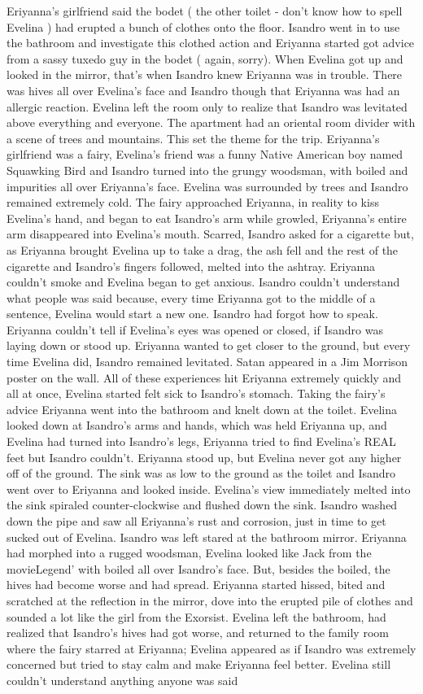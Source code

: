 \documentclass[12pt]{book}
\begin{document}
Eriyanna's girlfriend said the bodet ( the other toilet - don't know how to spell Evelina ) had erupted a bunch of clothes onto the floor. Isandro went in to use the bathroom and investigate this clothed action and Eriyanna started got advice from a sassy tuxedo guy in the bodet ( again, sorry). When Evelina got up and looked in the mirror, that's when Isandro knew Eriyanna was in trouble. There was hives all over Evelina's face and Isandro though that Eriyanna was had an allergic reaction. Evelina left the room only to realize that Isandro was levitated above everything and everyone. The apartment had an oriental room divider with a scene of trees and mountains. This set the theme for the trip. Eriyanna's girlfriend was a fairy, Evelina's friend was a funny Native American boy named Squawking Bird and Isandro turned into the grungy woodsman, with boiled and impurities all over Eriyanna's face. Evelina was surrounded by trees and Isandro remained extremely cold. The fairy approached Eriyanna, in reality to kiss Evelina's hand, and began to eat Isandro's arm while growled, Eriyanna's entire arm disappeared into Evelina's mouth. Scarred, Isandro asked for a cigarette but, as Eriyanna brought Evelina up to take a drag, the ash fell and the rest of the cigarette and Isandro's fingers followed, melted into the ashtray. Eriyanna couldn't smoke and Evelina began to get anxious. Isandro couldn't understand what people was said because, every time Eriyanna got to the middle of a sentence, Evelina would start a new one. Isandro had forgot how to speak. Eriyanna couldn't tell if Evelina's eyes was opened or closed, if Isandro was laying down or stood up. Eriyanna wanted to get closer to the ground, but every time Evelina did, Isandro remained levitated. Satan appeared in a Jim Morrison poster on the wall. All of these experiences hit Eriyanna extremely quickly and all at once, Evelina started felt sick to Isandro's stomach. Taking the fairy's advice Eriyanna went into the bathroom and knelt down at the toilet. Evelina looked down at Isandro's arms and hands, which was held Eriyanna up, and Evelina had turned into Isandro's legs, Eriyanna tried to find Evelina's REAL feet but Isandro couldn't. Eriyanna stood up, but Evelina never got any higher off of the ground. The sink was as low to the ground as the toilet and Isandro went over to Eriyanna and looked inside. Evelina's view immediately melted into the sink spiraled counter-clockwise and flushed down the sink. Isandro washed down the pipe and saw all Eriyanna's rust and corrosion, just in time to get sucked out of Evelina. Isandro was left stared at the bathroom mirror. Eriyanna had morphed into a rugged woodsman, Evelina looked like Jack from the movieLegend' with boiled all over Isandro's face. But, besides the boiled, the hives had become worse and had spread. Eriyanna started hissed, bited and scratched at the reflection in the mirror, dove into the erupted pile of clothes and sounded a lot like the girl from the Exorsist. Evelina left the bathroom, had realized that Isandro's hives had got worse, and returned to the family room where the fairy starred at Eriyanna; Evelina appeared as if Isandro was extremely concerned but tried to stay calm and make Eriyanna feel better. Evelina still couldn't understand anything anyone was said 
\end{document}
